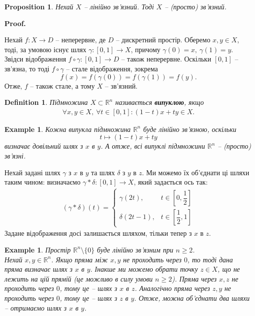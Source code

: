 \documentclass[a4paper, 10pt]{article}
\makeatletter
\theoremstyle{theoremdd}
\newtheorem{definition}[theorem]{Definition}
\newtheorem{example}[theorem]{Example}
\newtheorem{proposition}[theorem]{Proposition}
\renewenvironment{proof}[1][Proof.\\]{\par
\pushQED{\hfill \qed}%
\normalfont \topsep6\p@\@plus6\p@\relax
\trivlist
\item\relax
{\bfseries
#1\@addpunct{.}}\hspace\labelsep\ignorespaces
}{%
\popQED\endtrivlist\@endpefalse
}
\makeatother
\begin{document}
\begin{proposition}
Нехай $X$ -- лінійно зв'язний. Тоді $X$ -- (просто) зв'язний.
\end{proposition}

\begin{proof}
Нехай $f \colon X \to D$ -- неперервне, де $D$ -- дискретний простір. Оберемо $x,y \in X$, тоді, за умовою існує шлях $\gamma \colon [0,1] \to X$, причому $\gamma(0) = x,\ \gamma(1) = y$. Звідси відображення $f \circ \gamma \colon [0,1] \to D$ -- також неперервне. Оскільки $[0,1]$ -- зв'язна, то тоді $f \circ \gamma$ -- стале відображення, зокрема \[
f(x) = f(\gamma(0)) = f(\gamma(1)) = f(y).
\]
Отже, $f$ -- також стале, а тому $X$ -- зв'язний.
\end{proof}

\begin{definition}
Підмножина $X \subset \mathbb{R}^n$ називається \textbf{випуклою}, якщо
\begin{align*}
\forall x,y \in X,\ \forall t \in [0,1]: (1-t)x + ty \in X.
\end{align*}
\end{definition}

\begin{example}
Кожна випукла підмножина $\mathbb{R}^n$ буде лінійно зв'язною, оскільки \[
t \mapsto (1-t)x + ty
\] визначає довільний шлях з $x$ в $y$. А отже, всі випуклі підмножини $\mathbb{R}^n$ -- (просто) зв'язні.
\end{example}
\noindent
Нехай задані шлях $\gamma$ з $x$ в $y$ та шлях $\delta$ з $y$ в $z$. Ми можемо їх об'єднати ці шляхи таким чином: визначаємо $\gamma*\delta \colon [0,1] \to X$, який задається ось так:
\begin{align*}
(\gamma*\delta)(t) = \begin{cases} \gamma(2t), & t \in \left[0, \dfrac{1}{2}\right] \\[0.8em]
\delta(2t-1), & t \in \left[\dfrac{1}{2},1\right] \end{cases}
\end{align*}
Задане відображення досі залишається шляхом, тільки тепер з $x$ в $z$.

\begin{example}
Простір $\mathbb{R}^n \setminus \{0\}$ буде лінійно зв'язним при $n \geq 2$.\\
Нехай $x,y \in \mathbb{R}^n$. Якщо пряма між $x,y$ не проходить через $0$, то тоді дана пряма визначає шлях з $x$ в $y$. Інакше ми можемо обрати точку $z \in X$, що не лежить на цій прямій (це можливо в силу умови $n \geq 2$). Пряма через $x,z$ не проходить через $0$, тому це -- шлях з $x$ в $z$. Аналогічно пряма через $z,y$ не проходить через $0$, тому це -- шлях з $z$ в $y$. Отже, можна об'єднати два шляхи -- отримаємо шлях з $x$ в $y$.
\end{example}
\end{document}
